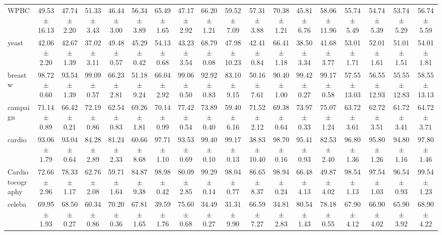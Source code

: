 \begin{table}[ht]
\begin{adjustbox}{max width=\textwidth}
\begin{tabular}{lccccccccccccccccc}
            WPBC & 49.53 $\pm$ 16.13 &  47.74 $\pm$ 2.20 &  51.33 $\pm$ 3.43 &  46.44 $\pm$ 3.00 &  56.34 $\pm$ 3.89 &  65.49 $\pm$ 1.65 &  47.17 $\pm$ 2.92 & 66.20 $\pm$ 1.21 &  59.52 $\pm$ 7.09 &  57.31 $\pm$ 3.88 &  70.38 $\pm$ 1.21 &  45.81 $\pm$ 6.76 & 58.06 $\pm$ 11.96 &  55.74 $\pm$ 5.49 &  54.74 $\pm$ 5.39 &  53.74 $\pm$ 5.29 &  56.74 $\pm$ 5.59 \\
           yeast &  42.06 $\pm$ 2.20 &  42.67 $\pm$ 1.39 &  37.02 $\pm$ 3.11 &  49.48 $\pm$ 0.57 &  45.29 $\pm$ 0.42 &  54.13 $\pm$ 0.68 &  43.23 $\pm$ 3.54 & 68.79 $\pm$ 0.08 & 47.98 $\pm$ 10.23 &  42.41 $\pm$ 0.84 &  66.41 $\pm$ 1.18 &  38.50 $\pm$ 3.34 &  41.68 $\pm$ 3.77 &  53.01 $\pm$ 1.71 &  52.01 $\pm$ 1.61 &  51.01 $\pm$ 1.51 &  54.01 $\pm$ 1.81 \\
         breastw &  98.72 $\pm$ 0.60 &  93.54 $\pm$ 1.39 &  99.09 $\pm$ 0.57 &  66.23 $\pm$ 2.81 &  51.18 $\pm$ 9.24 &  66.04 $\pm$ 2.92 &  99.06 $\pm$ 0.50 & 92.92 $\pm$ 0.83 &  83.10 $\pm$ 9.15 &  50.16 $\pm$ 7.61 &  90.40 $\pm$ 1.00 &  99.42 $\pm$ 0.27 &  99.17 $\pm$ 0.58 & 57.55 $\pm$ 13.03 & 56.55 $\pm$ 12.93 & 55.55 $\pm$ 12.83 & 58.55 $\pm$ 13.13 \\
        campaign &  71.14 $\pm$ 0.89 &  66.42 $\pm$ 0.21 &  72.19 $\pm$ 0.86 &  62.54 $\pm$ 0.83 &  69.26 $\pm$ 1.81 &  70.14 $\pm$ 0.99 &  77.42 $\pm$ 0.54 & 73.89 $\pm$ 0.40 &  59.40 $\pm$ 6.16 &  71.52 $\pm$ 2.12 &  69.38 $\pm$ 0.64 &  73.97 $\pm$ 0.33 &  75.07 $\pm$ 1.24 &  63.72 $\pm$ 3.61 &  62.72 $\pm$ 3.51 &  61.72 $\pm$ 3.41 &  64.72 $\pm$ 3.71 \\
          cardio &  93.06 $\pm$ 1.79 &  93.04 $\pm$ 0.64 &  84.28 $\pm$ 2.89 &  81.24 $\pm$ 2.33 &  60.66 $\pm$ 8.68 &  97.71 $\pm$ 1.10 &  93.53 $\pm$ 0.69 & 99.40 $\pm$ 0.10 &  99.17 $\pm$ 0.13 & 38.83 $\pm$ 10.40 &  98.70 $\pm$ 0.16 &  95.41 $\pm$ 0.93 &  82.53 $\pm$ 2.40 &  96.80 $\pm$ 1.36 &  95.80 $\pm$ 1.26 &  94.80 $\pm$ 1.16 &  97.80 $\pm$ 1.46 \\
Cardiotocography &  72.66 $\pm$ 2.96 &  78.33 $\pm$ 1.17 &  62.76 $\pm$ 2.08 &  59.71 $\pm$ 1.64 &  84.87 $\pm$ 9.38 &  98.98 $\pm$ 0.42 &  80.09 $\pm$ 2.85 & 99.29 $\pm$ 0.14 &  98.04 $\pm$ 0.77 &  86.65 $\pm$ 8.37 &  98.94 $\pm$ 0.24 &  66.48 $\pm$ 4.13 &  49.87 $\pm$ 4.02 &  98.54 $\pm$ 1.13 &  97.54 $\pm$ 1.03 &  96.54 $\pm$ 0.93 &  99.54 $\pm$ 1.23 \\
          celeba &  69.95 $\pm$ 1.93 &  68.50 $\pm$ 0.27 &  60.34 $\pm$ 0.86 &  70.20 $\pm$ 0.36 &  67.81 $\pm$ 1.65 &  39.59 $\pm$ 1.76 &  75.60 $\pm$ 0.68 & 34.49 $\pm$ 0.27 &  31.31 $\pm$ 9.90 &  66.59 $\pm$ 7.27 &  34.81 $\pm$ 2.83 &  80.54 $\pm$ 1.43 &  78.18 $\pm$ 0.55 &  67.90 $\pm$ 4.12 &  66.90 $\pm$ 4.02 &  65.90 $\pm$ 3.92 &  68.90 $\pm$ 4.22 \\

\end{tabular}
\end{adjustbox}
\end{table}
